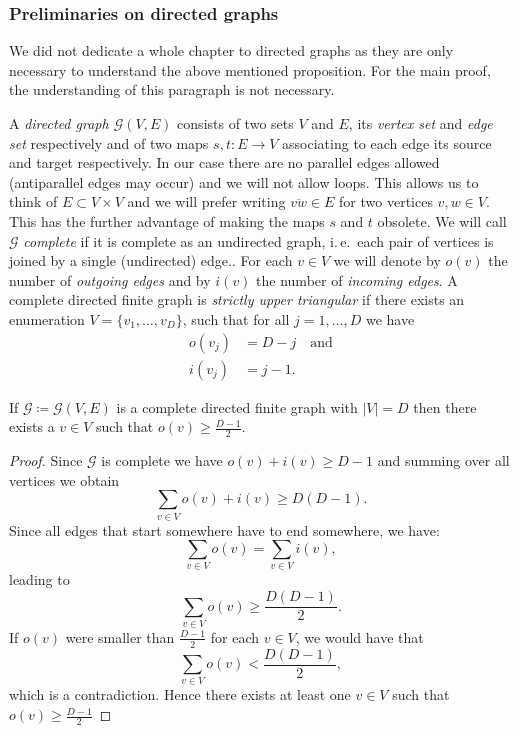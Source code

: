 \subsubsection*{Preliminaries on directed graphs}
We did not dedicate a whole chapter to directed graphs as they are only necessary to understand the above mentioned proposition. For the main proof, the understanding of this paragraph is not necessary.

\begin{defin}
  A \emph{directed graph \(\mathcal{G}(V,E)\)} consists of two sets \(V\) and \(E\), its \emph{vertex set} and \emph{edge set} respectively and of two maps \(s, t \colon E \to V\) associating to each edge its source and target respectively. In our case there are no parallel edges allowed (antiparallel edges may occur) and we will not allow loops. This allows us to think of \(E \subset V \times V\) and we will prefer writing \(\overline{vw} \in E\) for two vertices \(v,w \in V\). This has the further advantage of making the maps \(s\) and \(t\) obsolete. We will call \(\mathcal{G}\) \emph{complete} if it is complete as an undirected graph, i.\,e.\ each pair of vertices is joined by a single (undirected) edge.. For each \(v \in V\) we will denote by \(o(v)\) the number of \emph{outgoing edges} and by \(i(v)\) the number of \emph{incoming edges}. A complete directed finite graph is \emph{strictly upper triangular} if there exists an enumeration \(V = \{v_1, \dots, v_D\}\), such that for all \(j = 1, \dots, D\) we have
  \begin{align*}
    o(v_j) & = D - j\quad \text{and}\\
    i(v_j) & = j - 1.
  \end{align*}
\end{defin}

\begin{lemma}[{\cite[Lemma~A.6]{MR3509968}}]
  \label{lem:A.6}
  If \(\mathcal{G} \coloneqq \mathcal{G}(V,E)\) is a complete directed finite graph with \(|V| = D\) then there exists a \(v \in V\) such that \(o(v) \geq \frac{D-1}{2}\).
\end{lemma}

\begin{proof}
  Since \(\mathcal{G}\) is complete we have \(o(v) + i(v) \geq D - 1\) and summing over all vertices we obtain
  \[
    \sum_{v \in V} o(v) + i(v) \geq D(D-1).
  \]
  Since all edges that start somewhere have to end somewhere, we have:
  \[
    \sum_{v \in V} o(v) = \sum_{v \in V} i(v),
  \]
  leading to
  \[
    \sum_{v \in V} o(v) \geq \frac{D(D-1)}{2}.
  \]
  If \(o(v)\) were smaller than \(\frac{D-1}{2}\) for each \(v \in V\), we would have that
  \[
    \sum_{v \in V} o(v) < \frac{D(D-1)}{2},
  \]
  which is a contradiction. Hence there exists at least one \(v \in V\) such that \(o(v) \geq \frac{D-1}{2}\)
\end{proof}

